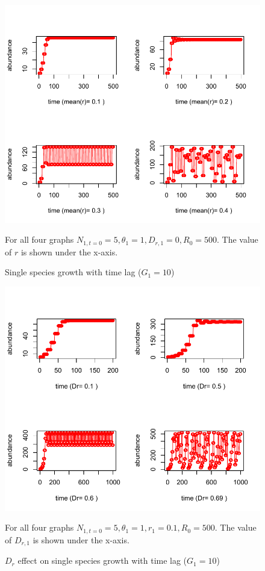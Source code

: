 \documentclass[12pt]{article}
\begin{document}
\begin{figure}
 \includegraphics[width=\textwidth]{1sp_sojourn.pdf}
 \caption{Single species growth with time lag ($G_1=10$)}
For all four graphs $ N_{1,t=0}=5, \theta_1=1, D_{r,1} = 0, R_0=500$. The value of $r$ is shown under the x-axis.
\end{figure}

\begin{figure}
 \includegraphics[width=\textwidth]{1sp_sojourn_Dreffect.pdf}
 \caption{$D_r$ effect on single species growth with time lag ($G_1=10$)}
For all four graphs $ N_{1,t=0}=5, \theta_1=1, r_1= 0.1, R_0=500$. The value of $D_{r,1}$ is shown under the x-axis.
\end{figure}
\end{document}
